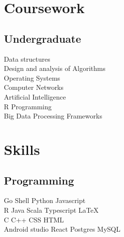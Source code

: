 \documentclass[]{manoj-resume}
\begin{document}
\begin{minipage}[t]{0.33\textwidth}

\section{Coursework}

\subsection{Undergraduate}
Data structures \\
Design and analysis of Algorithms \\
Operating Systems \\
Computer Networks \\
Artificial Intelligence \\
R Programming \\
Big Data Processing Frameworks \\


\section{Skills}
\subsection{Programming}
Go \textbullet{}   Shell \textbullet{} Python \textbullet{} Javascript \\
R  \textbullet{} Java \textbullet{} Scala \textbullet{} Typescript \textbullet{} \LaTeX\ \\ 
C \textbullet{} C++ \textbullet{} CSS \textbullet{} HTML \\
Android studio \textbullet{} React \textbullet{} Postgres \textbullet{} MySQL
\sectionsep

%
%

\end{minipage} 
\hfill
\end{document}
